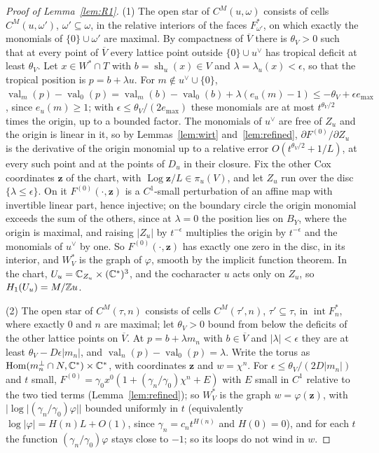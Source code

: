 \begin{proof}[Proof of Lemma~\ref{lem:R1}]
(1) The open star of $C^M(u,\omega)$ consists of cells $C^M(u,\omega')$, $\omega'\subseteq\omega$, in the relative interiors of
the faces $F^*_{\omega'}$, on which exactly the monomials of $\{0\}\cup\omega'$ are maximal. By compactness of $\overline V$
there is $\theta_V>0$ such that at every point of $\overline V$ every lattice point outside $\{0\}\cup u^\vee$ has tropical
deficit at least $\theta_V$. Let $x\in W^*\cap T$ with $b=\operatorname{sh}_u(x)\in V$ and $\lambda=\lambda_u(x)<\epsilon$,
so that the tropical position is $p=b+\lambda u$. For $m\notin u^\vee\cup\{0\}$, $\operatorname{val}_m(p)-\operatorname{val}_0
(p)=\operatorname{val}_m(b)-\operatorname{val}_0(b)+\lambda(e_u(m)-1)\le-\theta_V+\epsilon e_{\max}$, since $e_u(m)\ge1$;
with $\epsilon\le\theta_V/(2e_{\max})$ these monomials are at most $t^{\theta_V/2}$ times the origin, up to a bounded
factor. The monomials of $u^\vee$ are free of $Z_u$ and the origin is linear in it, so by Lemmas~\ref{lem:wirt}
and~\ref{lem:refined}, $\partial F^{(0)}/\partial Z_u$ is the derivative of the origin monomial up to a relative error
$O(t^{\theta_V/2}+1/L)$, at every such point and at the points of $D_u$ in their closure. Fix the other Cox coordinates
$\mathbf z$ of the chart, with $\operatorname{Log}\mathbf z/L\in\pi_u(V)$, and let $Z_u$ run over the disc $\{\lambda\le
\epsilon\}$. On it $F^{(0)}(\cdot,\mathbf z)$ is a $C^1$-small perturbation of an affine map with invertible linear part,
hence injective; on the boundary circle the origin monomial exceeds the sum of the others, since at $\lambda=0$ the
position lies on $B_Y$, where the origin is maximal, and raising $|Z_u|$ by $t^{-\epsilon}$ multiplies the origin by
$t^{-\epsilon}$ and the monomials of $u^\vee$ by one. So $F^{(0)}(\cdot,\mathbf z)$ has exactly one zero in the disc, in its
interior, and $W^*_V$ is the graph of $\varphi$, smooth by the implicit function theorem. In the chart, $U_u=\mathbb C_{Z_u}\times
(\mathbb C^*)^3$, and the cocharacter $u$ acts only on $Z_u$, so $H_1(U_u)=M/\mathbb Z u$.

(2) The open star of $C^M(\tau,n)$ consists of cells $C^M(\tau',n)$, $\tau'\subseteq\tau$, in $\operatorname{int}F^*_n$,
where exactly $0$ and $n$ are maximal; let $\theta_V>0$ bound from below the deficits of the other lattice points on
$\overline V$. At $p=b+\lambda m_n$ with $b\in\overline V$ and $|\lambda|<\epsilon$ they are at least $\theta_V-D\epsilon|m_n|$,
and $\operatorname{val}_n(p)-\operatorname{val}_0(p)=\lambda$. Write the torus as $\operatorname{Hom}(m_n^\perp\cap
N,\mathbb C^*)\times\mathbb C^*$, with coordinates $\mathbf z$ and $w=\chi^n$. For $\epsilon\le\theta_V/(2D|m_n|)$ and $t$ small,
$F^{(0)}=\gamma_0x^0(1+(\gamma_n/\gamma_0)\chi^n+E)$ with $E$ small in $C^1$ relative to the two tied terms
(Lemma~\ref{lem:refined}); so $W^*_V$ is the graph $w=\varphi(\mathbf z)$, with $|\log|(\gamma_n/\gamma_0)\varphi||$
bounded uniformly in $t$ (equivalently $\log|\varphi|=H(n)L+O(1)$, since $\gamma_n=c_nt^{H(n)}$ and $H(0)=0$), and for each
$t$ the function $(\gamma_n/\gamma_0)\varphi$ stays close to $-1$; so its loops do not wind in $w$.


\end{proof}
